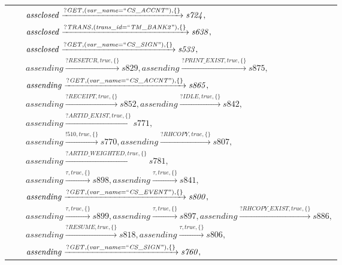 \begin{tabular}{lcl}
& & $\mathit{assclosed}\xrightarrow{\mathit{?GET}, \mathit{(var\_name = ``CS\_ACCNT")}, \{\}}\mathit{s724},$ \\
& & $\mathit{assclosed}\xrightarrow{\mathit{?TRANS}, \mathit{(trans\_id = ``TM\_BANK2")}, \{\}}\mathit{s638},$ \\
& & $\mathit{assclosed}\xrightarrow{\mathit{?GET}, \mathit{(var\_name = ``CS\_SIGN")}, \{\}}\mathit{s533},$ \\
& & $\mathit{assending}\xrightarrow{\mathit{?RESETCR}, \mathit{true}, \{\}}\mathit{s829},\mathit{assending}\xrightarrow{\mathit{?PRINT\_EXIST}, \mathit{true}, \{\}}\mathit{s875},$ \\
& & $\mathit{assending}\xrightarrow{\mathit{?GET}, \mathit{(var\_name = ``CS\_ACCNT")}, \{\}}\mathit{s865},$ \\
& & $\mathit{assending}\xrightarrow{\mathit{?RECEIPT}, \mathit{true}, \{\}}\mathit{s852},\mathit{assending}\xrightarrow{\mathit{?IDLE}, \mathit{true}, \{\}}\mathit{s842},$ \\
& & $\mathit{assending}\xrightarrow{\mathit{?ARTID\_EXIST}, \mathit{true}, \{\}}\mathit{s771},$ \\
& & $\mathit{assending}\xrightarrow{\mathit{!510}, \mathit{true}, \{\}}\mathit{s770},\mathit{assending}\xrightarrow{\mathit{?RHCOPY}, \mathit{true}, \{\}}\mathit{s807},$ \\
& & $\mathit{assending}\xrightarrow{\mathit{?ARTID\_WEIGHTED}, \mathit{true}, \{\}}\mathit{s781},$ \\
& & $\mathit{assending}\xrightarrow{\mathit{\tau}, \mathit{true}, \{\}}\mathit{s898},\mathit{assending}\xrightarrow{\mathit{\tau}, \mathit{true}, \{\}}\mathit{s841},$ \\
& & $\mathit{assending}\xrightarrow{\mathit{?GET}, \mathit{(var\_name = ``CS\_EVENT")}, \{\}}\mathit{s800},$ \\
& & $\mathit{assending}\xrightarrow{\mathit{\tau}, \mathit{true}, \{\}}\mathit{s899},\mathit{assending}\xrightarrow{\mathit{\tau}, \mathit{true}, \{\}}\mathit{s897},\mathit{assending}\xrightarrow{\mathit{?RHCOPY\_EXIST}, \mathit{true}, \{\}}\mathit{s886},$ \\
& & $\mathit{assending}\xrightarrow{\mathit{?RESUME}, \mathit{true}, \{\}}\mathit{s818},\mathit{assending}\xrightarrow{\mathit{\tau}, \mathit{true}, \{\}}\mathit{s806},$ \\
& & $\mathit{assending}\xrightarrow{\mathit{?GET}, \mathit{(var\_name = ``CS\_SIGN")}, \{\}}\mathit{s760},$ \\
\end{tabular}

